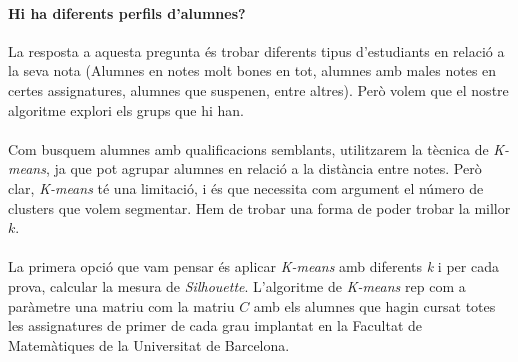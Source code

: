 \documentclass[12pt,a4paper,catalan]{article}
\begin{document}
\newpage

\paragraph{Hi ha diferents perfils d'alumnes?}
La resposta a aquesta pregunta és trobar diferents tipus d'estudiants en relació a la seva nota (Alumnes en notes molt bones en tot, alumnes amb males notes en certes assignatures, alumnes que suspenen, entre altres). Però volem que el nostre algoritme explori els grups que hi han.
\\
\\
Com busquem alumnes amb qualificacions semblants, utilitzarem la tècnica de \textit{K-means}, ja que pot agrupar alumnes en relació a la distància entre notes. Però clar, \textit{K-means} té una limitació, i és que necessita com argument el número de clusters que volem segmentar. Hem de trobar una forma de poder trobar la millor $k$.
\\
\\
La primera opció que vam pensar és aplicar \textit{K-means} amb diferents \textit{k} i per cada prova, calcular la mesura de \textit{Silhouette}. L'algoritme de \textit{K-means} rep com a paràmetre una matriu com la matriu $C$ amb els alumnes que hagin cursat totes les assignatures de primer de cada grau implantat en la Facultat de Matemàtiques de la Universitat de Barcelona. 
\end{document}
